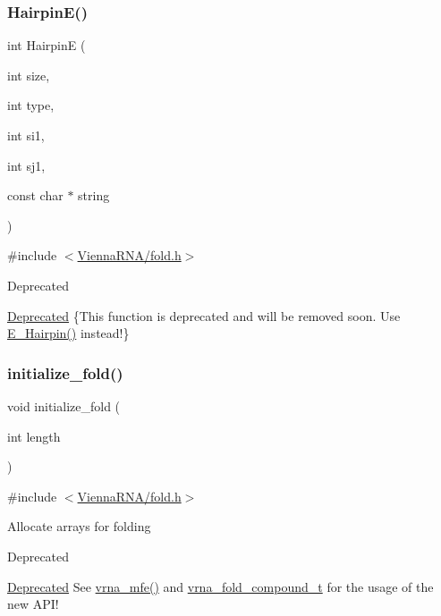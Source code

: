 \subsubsection{\texorpdfstring{Hairpin\+E()}{HairpinE()}}
{\footnotesize\ttfamily int HairpinE (\begin{DoxyParamCaption}\item[{int}]{size,  }\item[{int}]{type,  }\item[{int}]{si1,  }\item[{int}]{sj1,  }\item[{const char $\ast$}]{string }\end{DoxyParamCaption})}



{\ttfamily \#include $<$\hyperlink{fold_8h}{Vienna\+R\+N\+A/fold.\+h}$>$}

\begin{DoxyRefDesc}{Deprecated}
\item[\hyperlink{deprecated__deprecated000079}{Deprecated}]\{This function is deprecated and will be removed soon. Use \hyperlink{group__loops_gadf943ee9a45b7f4cee9192c06210dace}{E\+\_\+\+Hairpin()} instead!\} \end{DoxyRefDesc}
\mbox{\label{group__mfe__fold__single_gac3f0a28d9cb609d388b155445073fd20}} 
\subsubsection{\texorpdfstring{initialize\+\_\+fold()}{initialize\_fold()}}
{\footnotesize\ttfamily void initialize\+\_\+fold (\begin{DoxyParamCaption}\item[{int}]{length }\end{DoxyParamCaption})}



{\ttfamily \#include $<$\hyperlink{fold_8h}{Vienna\+R\+N\+A/fold.\+h}$>$}

Allocate arrays for folding~\newline
\begin{DoxyRefDesc}{Deprecated}
\item[\hyperlink{deprecated__deprecated000080}{Deprecated}]See \hyperlink{group__mfe__fold_gabd3b147371ccf25c577f88bbbaf159fd}{vrna\+\_\+mfe()} and \hyperlink{group__fold__compound_ga1b0cef17fd40466cef5968eaeeff6166}{vrna\+\_\+fold\+\_\+compound\+\_\+t} for the usage of the new A\+P\+I!\end{DoxyRefDesc}
